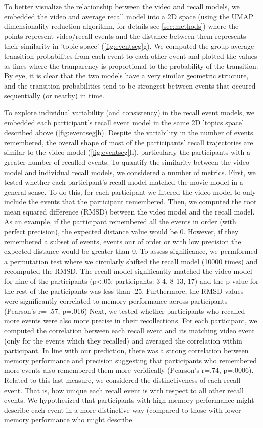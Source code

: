 \documentclass[a4paper,man,natbib,floatsintext]{apa6}
\begin{document}
To better visualize the relationship between the video and recall models, we embedded the video and average recall model into a 2D space (using the UMAP dimensionality reduction algorithm, for details see \ref{sec:methods}) where the points represent video/recall events and the distance between them represents their similarity in 'topic space' (\ref{fig:eventseg}g). We computed the group average transition probabilites from each event to each other event and plotted the values as lines where the tranparency is proportional to the probability of the transition.  By eye, it is clear that the two models have a very similar geometric structure, and the transition probabilities tend to be strongest between events that occured sequentially (or nearby) in time.

To explore individual variability (and consistency) in the recall event models, we embedded each participant's recall event model in the same 2D 'topics space' described above (\ref{fig:eventseg}h). Despite the variability in the number of events remembered, the overall shape of most of the participants' recall trajectories are similar to the video model (\ref{fig:eventseg}h), particularly the participants with a greater number of recalled events. To quantify the similarity between the video model and individual recall models, we considered a number of metrics.  First, we tested whether each participant's recall model matched the movie model in a general sense. To do this, for each participant we filtered the video model to only include the events that the participant remembered. Then, we computed the root mean squared difference (RMSD) between the video model and the recall model. As an example, if the participant remembered all the events in order (with perfect precision), the expected distance value would be 0. However, if they remembered a subset of events, events our of order or with low precision the expected distance would be greater than 0. To assess significance, we permformed a permutation test where we circularly shifted the recall model (10000 times) and recomputed the RMSD. The recall model significantly matched the video model for nine of the participants (p<.05; participants: 3-4, 8-13, 17) and the p-value for the rest of the participants was less than .25. Furthermore, the RMSD values were significantly correlated to memory performance across participants (Pearson's r=-.57, p=.016)  Next, we tested whether participants who recalled more events were also more precise in their recollections. For each participant, we computed the correlation between each recall event and its matching video event (only for the events which they recalled) and averaged the correlation within participant.  In line with our prediction, there was a strong correlation between memory performance and precision suggesting that participants who remembered more events also remembered them more veridically (Pearson's r=.74, p=.0006). Related to this last measure, we considered the distinctiveness of each recall event. That is, how unique each recall event is with respect to all other recall events. We hypothesized that participants with high memory performance might describe each event in a more distinctive way (compared to those with lower memory performance who might describe 
\end{document}
